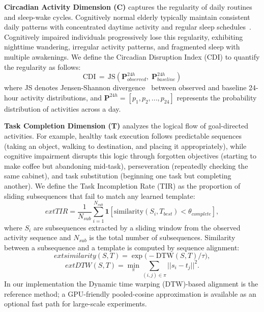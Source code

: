 \documentclass[sigconf, anonymous, 9pt, nonacm]{acmart}
\begin{document}
\noindent\textbf{Circadian Activity Dimension (C)} captures the regularity of daily routines and sleep-wake cycles. Cognitively normal elderly typically maintain consistent daily patterns with concentrated daytime activity and regular sleep schedules~\cite{Musiek2018RestActivity}. Cognitively impaired individuals progressively lose this regularity, exhibiting nighttime wandering, irregular activity patterns, and fragmented sleep with multiple awakenings.
We define the Circadian Disruption Index (CDI) to quantify the regularity as follows:
\begin{equation*}
\text{CDI}\, = \,\text{JS}(\mathbf{P}_{observed}^{24h},\; \mathbf{P}_{baseline}^{24h})
\end{equation*}
where JS denotes Jensen-Shannon divergence~\cite{lin1991divergence} between observed and baseline 24-hour activity distributions, and $\mathbf{P}^{24h} = [p_1, p_2, ..., p_{24}]$ represents the probability distribution of activities across a day.

\noindent\textbf{Task Completion Dimension (T)} analyzes the logical flow of goal-directed activities. 
For example, healthy task execution follows predictable sequences (taking an object, walking to destination, and placing it appropriately), while cognitive impairment disrupts this logic through forgotten objectives (starting to make coffee but abandoning mid-task), perseveration (repeatedly checking the same cabinet), and task substitution (beginning one task but completing another). 
We define the Task Incompletion Rate (TIR) as the proportion of sliding subsequences that fail to match any learned template:
\begin{equation*}
	ext{TIR} = \frac{1}{N_{sub}}\sum_{i=1}^{N_{sub}} \mathbf{1}[\text{similarity}(S_i, T_{best}) < \theta_{complete}],
\end{equation*}
where $S_i$ are subsequences extracted by a sliding window from the observed activity sequence and $N_{sub}$ is the total number of subsequences. Similarity between a subsequence and a template is computed by sequence alignment:
\begin{equation*}
	ext{similarity}(S, T) = \exp\big(-\text{DTW}(S, T) / \tau\big),
\end{equation*}
\begin{equation*}
	ext{DTW}(S, T) = \min_{\pi} \sum_{(i,j) \in \pi} ||s_i - t_j||^2.
\end{equation*}
In our implementation the Dynamic time warping (DTW)-based alignment is the reference method; a GPU-friendly pooled-cosine approximation is available as an optional fast path for large-scale experiments.
\end{document}

